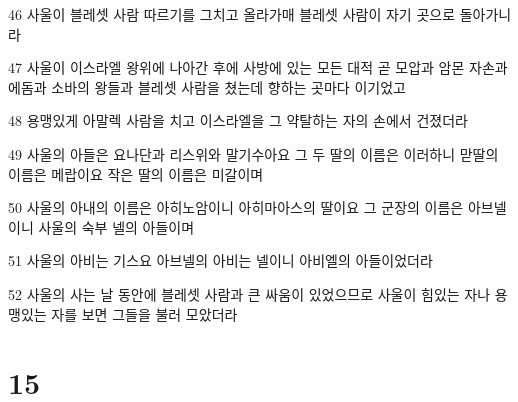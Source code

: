 \par 46 사울이 블레셋 사람 따르기를 그치고 올라가매 블레셋 사람이 자기 곳으로 돌아가니라
\par 47 사울이 이스라엘 왕위에 나아간 후에 사방에 있는 모든 대적 곧 모압과 암몬 자손과 에돔과 소바의 왕들과 블레셋 사람을 쳤는데 향하는 곳마다 이기었고
\par 48 용맹있게 아말렉 사람을 치고 이스라엘을 그 약탈하는 자의 손에서 건졌더라
\par 49 사울의 아들은 요나단과 리스위와 말기수아요 그 두 딸의 이름은 이러하니 맏딸의 이름은 메랍이요 작은 딸의 이름은 미갈이며
\par 50 사울의 아내의 이름은 아히노암이니 아히마아스의 딸이요 그 군장의 이름은 아브넬이니 사울의 숙부 넬의 아들이며
\par 51 사울의 아비는 기스요 아브넬의 아비는 넬이니 아비엘의 아들이었더라
\par 52 사울의 사는 날 동안에 블레셋 사람과 큰 싸움이 있었으므로 사울이 힘있는 자나 용맹있는 자를 보면 그들을 불러 모았더라

\chapter{15}

